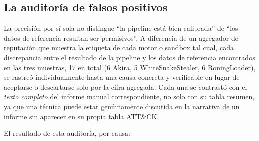 \subsection{La auditor\'ia de falsos positivos}
\label{sec:fp-audit}

La precisi\'on por s\'i sola no distingue ``la pipeline est\'a bien
calibrada'' de ``los datos de referencia resultan ser permisivos''. A
diferencia de un agregador de reputaci\'on que muestra la etiqueta de
cada motor o sandbox tal cual, cada discrepancia entre el resultado
de la pipeline y los datos de referencia encontrados en las tres muestras,
17 en total (6 Akira, 5 WhiteSnakeStealer, 6 RoningLoader), se
rastre\'o individualmente hasta una causa concreta y verificable en
lugar de aceptarse o descartarse solo por la cifra agregada. Cada una
se contrast\'o con el \emph{texto completo} del informe manual
correspondiente, no solo con su tabla resumen, ya que una t\'ecnica
puede estar gen\'uinamente discutida en la narrativa de un informe sin
aparecer en su propia tabla ATT\&CK.

El resultado de esta auditor\'ia, por causa:

